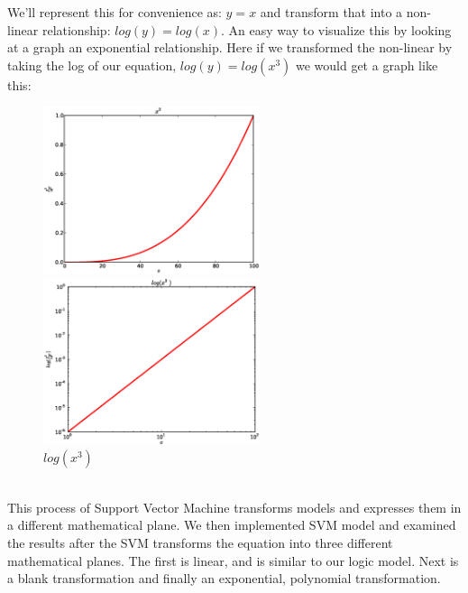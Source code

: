 \documentclass{article}
\begin{document}
We'll represent this for convenience as: $y=x$ and transform that into a non-linear relationship: $log(y)=log(x)$. An easy way to visualize this by looking at a graph an exponential relationship. Here if we transformed the non-linear by taking the log of our equation, $log(y)=log(x^3)$ we would get a graph like this: 
\\
\begin{figure}[ht]
\begin{minipage}[b]{0.45\linewidth}
\centering
\includegraphics[width=2.5in]{eps/X^3.eps}
\caption{$x^3$}
\label{fig:figure1}
\end{minipage}
\hspace{0.2cm}
\begin{minipage}[b]{0.45\linewidth}
\centering
\includegraphics[width=2.5in]{eps/log_X^3.eps}
\caption{$log(x^3)$}
\label{fig:figure2}
\end{minipage}
\end{figure}
\\

This process of Support Vector Machine transforms models and expresses them in a different mathematical plane. We then implemented SVM model and examined the results after the SVM transforms the equation into three different mathematical planes. The first is linear, and is similar to our logic model. Next is a blank transformation and finally an exponential, polynomial transformation.\\
\end{document}
